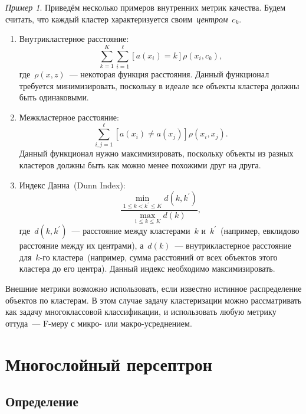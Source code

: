 \documentclass[a4paper, 12pt]{article}
\renewcommand{\leq}{\leqslant}
\theoremstyle{plain} %
\theoremstyle{definition} %
\theoremstyle{remark} %
\newtheorem{example}{Пример}
\begin{document}
\begin{example}
Приведём несколько примеров внутренних метрик качества.
Будем считать, что каждый кластер характеризуется своим~\emph{центром}~$c_k$.
\begin{enumerate}
    \item Внутрикластерное расстояние:
        \begin{equation}
        \label{eq:intracluster}
            \sum_{k = 1}^{K}
            \sum_{i = 1}^{\ell}
                [a(x_i) = k]
                \rho(x_i, c_k),
        \end{equation}
        где~$\rho(x, z)$~--- некоторая функция расстояния.
        Данный функционал требуется минимизировать, поскольку в идеале
        все объекты кластера должны быть одинаковыми.
    \item Межкластерное расстояние:
        \[
            \sum_{i, j = 1}^{\ell}
                [a(x_i) \neq a(x_j)]
                \rho(x_i, x_j).
        \]
        Данный функционал нужно максимизировать, поскольку
        объекты из разных кластеров должны быть как можно менее похожими друг на друга.
    \item Индекс Данна~(Dunn Index):
        \[
            \frac{
                \underset{1 \leq k < k^\prime \leq K}{\min}
                    d(k, k^\prime)
            }{
                \underset{1 \leq k \leq K}{\max}
                    d(k)
            },
        \]
        где~$d(k, k^\prime)$~--- расстояние между кластерами~$k$ и~$k^\prime$~(например, евклидово расстояние
        между их центрами), а~$d(k)$~--- внутрикластерное расстояние для~$k$-го кластера~(например,
        сумма расстояний от всех объектов этого кластера до его центра).
        Данный индекс необходимо максимизировать.
\end{enumerate}

Внешние метрики возможно использовать, если известно истинное распределение объектов по кластерам.
В этом случае задачу кластеризации можно рассматривать как задачу многоклассовой классификации,
и использовать любую метрику оттуда~--- F-меру с микро- или макро-усреднением.

\section{Многослойный персептрон}

\subsection{Определение}


\end{example}
\end{document}
